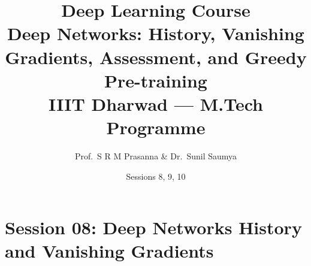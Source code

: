 \documentclass[12pt,a4paper]{article}
\title{%
  {\Large\bfseries Deep Learning Course}\\[6pt]
  {\LARGE Deep Networks: History, Vanishing Gradients, Assessment, and Greedy Pre-training}\\[4pt]
  {\normalsize IIIT Dharwad --- M.Tech Programme}
}
\author{Prof.\ S R M Prasanna \& Dr.\ Sunil Saumya}
\date{Sessions 8, 9, 10}
\begin{document}
\maketitle
\tableofcontents
\clearpage

\part{Session 08: Deep Networks History and Vanishing Gradients}


\end{document}
